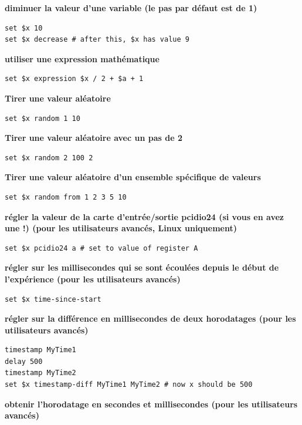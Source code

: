 \documentclass[
]{book}
\begin{document}
\textbf{diminuer la valeur d'une variable (le pas par défaut est de 1)}

\begin{verbatim}
set $x 10
set $x decrease # after this, $x has value 9
\end{verbatim}

\textbf{utiliser une expression mathématique}

\begin{verbatim}
set $x expression $x / 2 + $a + 1
\end{verbatim}

\textbf{Tirer une valeur aléatoire}

\begin{verbatim}
set $x random 1 10
\end{verbatim}

\textbf{Tirer une valeur aléatoire avec un pas de 2}

\begin{verbatim}
set $x random 2 100 2
\end{verbatim}

\textbf{Tirer une valeur aléatoire d'un ensemble spécifique de valeurs}

\begin{verbatim}
set $x random from 1 2 3 5 10
\end{verbatim}

\textbf{régler la valeur de la carte d'entrée/sortie pcidio24 (si vous
en avez une !) (pour les utilisateurs avancés, Linux uniquement)}

\begin{verbatim}
set $x pcidio24 a # set to value of register A
\end{verbatim}

\textbf{régler sur les millisecondes qui se sont écoulées depuis le
début de l'expérience (pour les utilisateurs avancés)}

\begin{verbatim}
set $x time-since-start
\end{verbatim}

\textbf{régler sur la différence en millisecondes de deux horodatages
(pour les utilisateurs avancés)}

\begin{verbatim}
timestamp MyTime1
delay 500
timestamp MyTime2
set $x timestamp-diff MyTime1 MyTime2 # now x should be 500
\end{verbatim}

\textbf{obtenir l'horodatage en secondes et millisecondes (pour les
utilisateurs avancés)}
\end{document}
